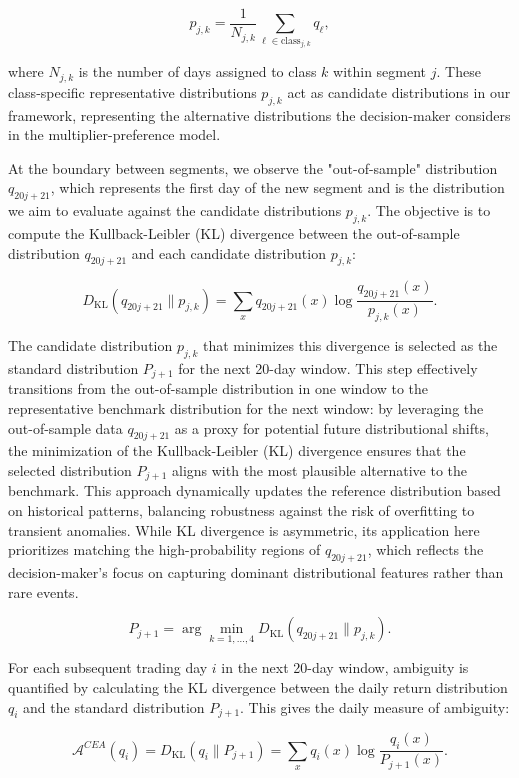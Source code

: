 \documentclass[preprint,12pt,authoryear]{elsarticle}
\begin{document}
\[
p_{j,k} = \frac{1}{N_{j,k}} \sum_{\ell \in \text{class}_{j,k}} q_{\ell},
\]

where \(N_{j,k}\) is the number of days assigned to class \(k\) within segment \(j\). These class-specific representative distributions \(p_{j,k}\) act as candidate distributions in our framework, representing the alternative distributions the decision-maker considers in the multiplier-preference model.

At the boundary between segments, we observe the "out-of-sample" distribution \(q_{20j+21}\), which represents the first day of the new segment and is the distribution we aim to evaluate against the candidate distributions \(p_{j,k}\). The objective is to compute the Kullback-Leibler (KL) divergence between the out-of-sample distribution \(q_{20j+21}\) and each candidate distribution \(p_{j,k}\):

\[
D_{\mathrm{KL}}(q_{20j+21} \parallel p_{j,k}) = \sum_{x} q_{20j+21}(x) \log \frac{q_{20j+21}(x)}{p_{j,k}(x)}.
\]

The candidate distribution $p_{j,k}$ that minimizes this divergence is selected as the standard distribution $P_{j+1}$ for the next 20-day window. This step effectively transitions from the out-of-sample distribution in one window to the representative benchmark distribution for the next window:
by leveraging the out-of-sample data $q_{20j+21}$ as a proxy for potential future distributional shifts, the minimization of the Kullback-Leibler (KL) divergence ensures that the selected distribution $P_{j+1}$ aligns with the most plausible alternative to the benchmark. This approach dynamically updates the reference distribution based on historical patterns, balancing robustness against the risk of overfitting to transient anomalies. While KL divergence is asymmetric, its application here prioritizes matching the high-probability regions of $q_{20j+21}$, which reflects the decision-maker's focus on capturing dominant distributional features rather than rare events.

\[
P_{j+1} = \arg\min_{k=1,\dots,4} D_{\mathrm{KL}}(q_{20j+21} \parallel p_{j,k}).
\]

For each subsequent trading day \(i\) in the next 20-day window, ambiguity is quantified by calculating the KL divergence between the daily return distribution \(q_i\) and the standard distribution \(P_{j+1}\). This gives the daily measure of ambiguity:

\[
\mathcal{A}^{CEA}(q_i) =  D_{\mathrm{KL}}(q_i \parallel P_{j+1}) = \sum_{x} q_i(x) \log \frac{q_i(x)}{P_{j+1}(x)}.
\]
\end{document}
